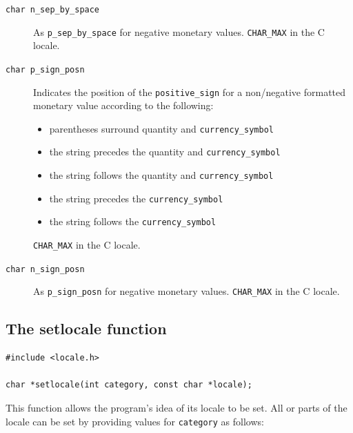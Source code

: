 \begin{description}
  \item[\texttt{\small char n\_sep\_by\_space}]
    As \texttt{\small p\_sep\_by\_space} for negative monetary values.
    \texttt{CHAR\_MAX} in the C locale.

   \item[\texttt{char p\_sign\_posn}] 
    Indicates the position of the \texttt{positive\_sign}  for  a
     non\-/negative   formatted  monetary  value  according  to  the
     following:


    \begin{itemize}
     \item parentheses surround quantity and \texttt{currency\_symbol}
     \item the string precedes the quantity and \texttt{currency\_symbol}
     \item the string follows the quantity and \texttt{currency\_symbol}
     \item the string precedes the \texttt{currency\_symbol}
     \item the string follows the \texttt{currency\_symbol}
    \end{itemize}

    \texttt{CHAR\_MAX} in the C locale.

   

   \item[\texttt{char  n\_sign\_posn}] As \texttt{p\_sign\_posn} for negative monetary
    values.  \texttt{CHAR\_MAX} in the C locale.
  \end{description}

  \subsection{The setlocale function}
   

   \begin{Verbatim}
#include <locale.h>

char *setlocale(int category, const char *locale);
\end{Verbatim}

   This function allows the program's idea of its locale to  be
    set.   All  or  parts  of the locale can be set by providing
    values for \texttt{category} as follows:


